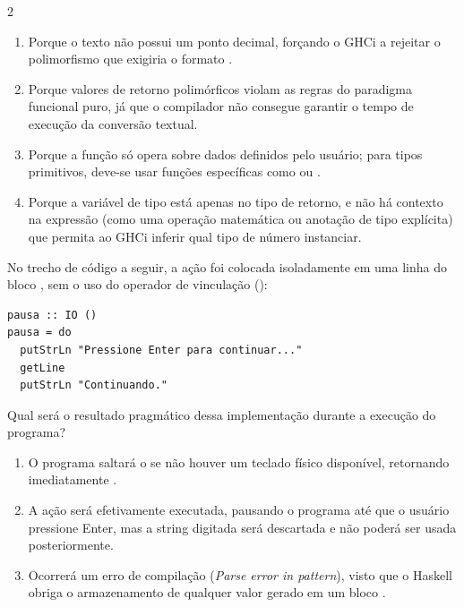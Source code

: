 \documentclass[a4paper,10pt,brazil]{article}
\begin{document}
\begin{multicols}{2}
\begin{enumerate}
  \item Porque o texto  não possui um ponto decimal, forçando o GHCi a rejeitar o polimorfismo que exigiria o formato .

  \item Porque valores de retorno polimórficos violam as regras do paradigma funcional puro, já que o compilador não consegue garantir o tempo de execução da conversão textual.

  \item Porque a função  só opera sobre dados definidos pelo usuário; para tipos primitivos, deve-se usar funções específicas como  ou .

  \item Porque a variável de tipo  está apenas no tipo de retorno, e não há contexto na expressão (como uma operação matemática ou anotação de tipo explícita) que permita ao GHCi inferir qual tipo de número instanciar.


\end{enumerate}

No trecho de código a seguir, a ação  foi colocada isoladamente em uma linha do bloco , sem o uso do operador de vinculação (\haskellinline{<-}):

\begin{verbatim}
pausa :: IO ()
pausa = do
  putStrLn "Pressione Enter para continuar..."
  getLine
  putStrLn "Continuando."
\end{verbatim}

Qual será o resultado pragmático dessa implementação durante a execução do programa?

\begin{enumerate}
  \item O programa saltará o  se não houver um teclado físico disponível, retornando imediatamente .

  \item A ação  será efetivamente executada, pausando o programa até que o usuário pressione Enter, mas a string digitada será descartada e não poderá ser usada posteriormente.

  \item Ocorrerá um erro de compilação (\emph{Parse error in pattern}), visto que o Haskell obriga o armazenamento de qualquer valor gerado em um bloco .


\end{enumerate}
\end{multicols}
\end{document}

